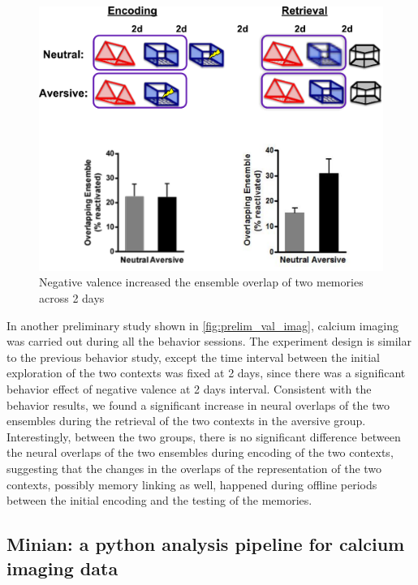 \documentclass[master.tex]{subfiles}
\begin{document}
\begin{figure}
  \centering \includegraphics[scale = .4]{Figures/val_retro_prelim_imag.pdf}
  \caption{\footnotesize Negative valence increased the ensemble overlap of two
    memories across 2 days}
  \label{fig:prelim_val_imag}
\end{figure}

In another preliminary study shown in \autoref{fig:prelim_val_imag}, calcium
imaging was carried out during all the behavior sessions. The experiment design
is similar to the previous behavior study, except the time interval between the
initial exploration of the two contexts was fixed at 2 days, since there was a
significant behavior effect of negative valence at 2 days interval. Consistent
with the behavior results, we found a significant increase in neural overlaps of
the two ensembles during the retrieval of the two contexts in the aversive
group. Interestingly, between the two groups, there is no significant difference
between the neural overlaps of the two ensembles during encoding of the two
contexts, suggesting that the changes in the overlaps of the representation of
the two contexts, possibly memory linking as well, happened during offline
periods between the initial encoding and the testing of the memories.

\subsection*{Minian: a python analysis pipeline for calcium imaging data}
\end{document}
